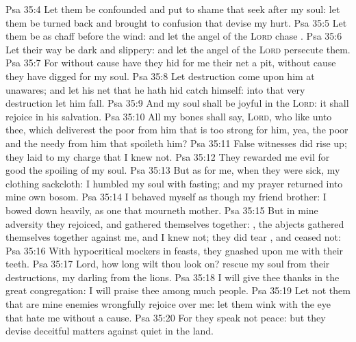 \vs Psa 35:4 Let them be confounded and put to shame that seek after my soul: let them be turned back and brought to confusion that devise my hurt.
\vs Psa 35:5 Let them be as chaff before the wind: and let the angel of the \textsc{Lord} chase .
\vs Psa 35:6 Let their way be dark and slippery: and let the angel of the \textsc{Lord} persecute them.
\vs Psa 35:7 For without cause have they hid for me their net  a pit,  without cause they have digged for my soul.
\vs Psa 35:8 Let destruction come upon him at unawares; and let his net that he hath hid catch himself: into that very destruction let him fall.
\vs Psa 35:9 And my soul shall be joyful in the \textsc{Lord}: it shall rejoice in his salvation.
\vs Psa 35:10 All my bones shall say, \textsc{Lord}, who  like unto thee, which deliverest the poor from him that is too strong for him, yea, the poor and the needy from him that spoileth him?
\vs Psa 35:11 False witnesses did rise up; they laid to my charge  that I knew not.
\vs Psa 35:12 They rewarded me evil for good  the spoiling of my soul.
\vs Psa 35:13 But as for me, when they were sick, my clothing  sackcloth: I humbled my soul with fasting; and my prayer returned into mine own bosom.
\vs Psa 35:14 I behaved myself as though  my friend  brother: I bowed down heavily, as one that mourneth  mother.
\vs Psa 35:15 But in mine adversity they rejoiced, and gathered themselves together: , the abjects gathered themselves together against me, and I knew  not; they did tear , and ceased not:
\vs Psa 35:16 With hypocritical mockers in feasts, they gnashed upon me with their teeth.
\vs Psa 35:17 Lord, how long wilt thou look on? rescue my soul from their destructions, my darling from the lions.
\vs Psa 35:18 I will give thee thanks in the great congregation: I will praise thee among much people.
\vs Psa 35:19 Let not them that are mine enemies wrongfully rejoice over me:  let them wink with the eye that hate me without a cause.
\vs Psa 35:20 For they speak not peace: but they devise deceitful matters against  quiet in the land.
